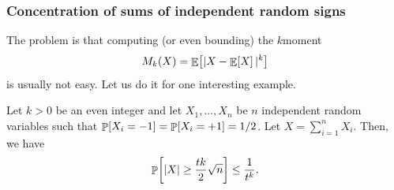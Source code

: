 \subsubsection{Concentration of sums of independent random signs}

The problem is that computing (or even bounding) the $k$\th moment
\begin{equation*}
    M_k(X) = \mathop{\mathbb{E}}\!\left[ {|X-\mathop{\mathbb{E}}\!\left[ {X} \right]|^k} \right]
\end{equation*}
 is usually not easy. Let us do it for one
interesting example.
\begin{lemma}
    Let $k > 0$ be an even integer and let $X_1, \ldots, X_n$ be $n$
    independent random variables such that
    $\Prob{X_i=-1} = \Prob{X_i =+1} = 1/2$. Let
    $X = \sum_{i=1}^n X_i$. Then, we have
    \begin{align*}
      \Prob{\cardin{X} \geq \frac{tk}{2} \sqrt{n}}%
      \leq%
      \frac{1}{t^k}.
    \end{align*}
\end{lemma}
